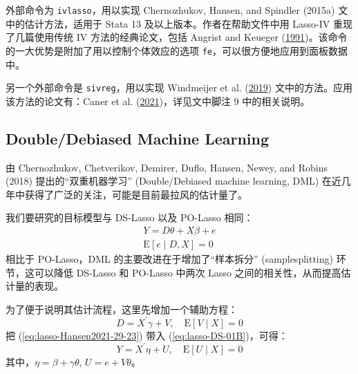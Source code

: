 {外部命令为 \texttt{ivlasso}，用以实现  Chernozhukov, Hansen, and Spindler (2015a) 文中的估计方法，适用于 Stata 13 及以上版本。作者在帮助文件中用 Lasso-IV 重现了几篇使用传统 IV 方法的经典论文，包括 Angrist and Keueger (\href{http://sci-hub.ren/10.2307/2937954}{1991})。该命令的一大优势是附加了用以控制个体效应的选项 \texttt{fe}，可以很方便地应用到面板数据中。 

另一个外部命令是 \texttt{sivreg}，用以实现 Windmeijer et al. (\href{http://sci-hub.ren/10.1080/01621459.2018.1498346}{2019}) 文中的方法。应用该方法的论文有：Caner et al. (\href{http://sci-hub.ren/10.1016/j.iref.2021.07.010}{2021})，详见文中脚注 9 中的相关说明。

\subsection{Double/Debiased Machine Learning}\label{sec:lasso-DML}
由 Chernozhukov, Chetverikov, Demirer, Duflo, Hansen, Newey, and Robins (2018) 提出的“双重机器学习” (Double/Debiased machine learning, DML) 在近几年中获得了广泛的关注，可能是目前最拉风的估计量了。%

我们要研究的目标模型与 DS-Lasso 以及 PO-Lasso 相同：
\begin{equation}\label{eq:lasso-DS-01B}
\begin{aligned}%
Y = D \theta + X \beta + e \\
\mathrm{E}[e \mid D, X] =0
\end{aligned}
\end{equation}
相比于 PO-Lasso，DML 的主要改进在于增加了“样本拆分” (samplesplitting) 环节，这可以降低 DS-Lasso 和 PO-Lasso 中两次 Lasso 之间的相关性，从而提高估计量的表现。

为了便于说明其估计流程，这里先增加一个辅助方程：
\begin{equation}\label{eq:lasso-Hansen2021-29-23}
D=X^{\prime} \gamma+V, \quad \mathrm{E}[V \mid X]=0
\end{equation}
把 (\ref{eq:lasso-Hansen2021-29-23}) 带入 (\ref{eq:lasso-DS-01B})，可得：
\begin{equation}\label{eq:lasso-Hansen2021-29-24}
Y=X^{\prime} \eta+U, \quad \mathrm{E}[U \mid X]=0
\end{equation}
其中，$\eta=\beta+\gamma \theta$, $U=e+V \theta$。

}
